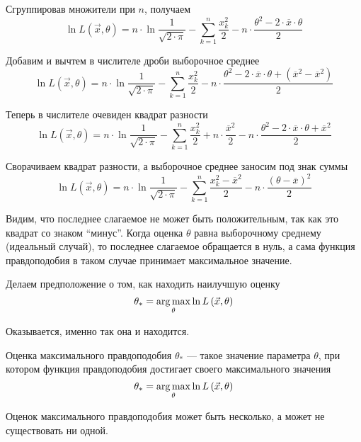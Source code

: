 \begin{example}
  Сгруппировав множители при $n$, получаем
  $$\ln{L\left( \vec{x},\theta \right)}
    =n\cdot\ln{\frac{1}{\sqrt{2\cdot\pi}}}
      -\sum_{k=1}^n \frac{x_k^2}{2}
      -n\cdot\frac{\theta^2
        -2\cdot\overline{x}\cdot\theta}{2}$$

  Добавим и вычтем в числителе дроби выборочное среднее
  $$\ln{L\left( \vec{x},\theta \right)}
    =n\cdot\ln{\frac{1}{\sqrt{2\cdot\pi}}}
      -\sum_{k=1}^n \frac{x_k^2}{2}
      -n\cdot\frac{\theta^2
        -2\cdot\overline{x}\cdot\theta
        +\left(\overline{x}^2-\overline{x}^2\right)}{2}$$

  Теперь в числителе очевиден квадрат разности
  $$\ln{L\left( \vec{x},\theta \right)}
    =n\cdot\ln{\frac{1}{\sqrt{2\cdot\pi}}}
      -\sum_{k=1}^n \frac{x_k^2}{2}
      +n\cdot\frac{\overline{x}^2}{2}
      -n\cdot\frac{\theta^2
        -2\cdot\overline{x}\cdot\theta
        +\overline{x}^2}{2}$$

  Сворачиваем квадрат разности,
  а выборочное среднее заносим под знак суммы
  $$\ln{L\left( \vec{x},\theta \right)}
    =n\cdot\ln{\frac{1}{\sqrt{2\cdot\pi}}}
      -\sum_{k=1}^n \frac{x_k^2-\overline{x}^2}{2}
      -n\cdot\frac{\left(\theta-\overline{x}\right)^2}{2}$$

  Видим, что последнее слагаемое не может быть положительным,
  так как это квадрат со знаком ``минус''.
  Когда оценка $\theta$ равна выборочному среднему (идеальный случай),
  то последнее слагаемое обращается в нуль, а сама функция правдоподобия
  в таком случае принимает максимальное значение.

  Делаем предположение о том, как находить наилучшую оценку
  $$\theta_*=\underset{\theta}{\operatorname{arg\,max}}\ln{L\left( \vec{x},\theta \right)}$$

  Оказывается, именно так она и находится.
\end{example}

\begin{definition}
  \label{def:maximumLikelihoodEstimation}
  Оценка максимального правдоподобия
  $\theta_*$ --- такое значение параметра $\theta$,
  при котором функция правдоподобия достигает своего максимального значения
  $$\theta_*=\underset{\theta}{\operatorname{arg\,max}}\ln{L\left( \vec{x},\theta \right)}$$
\end{definition}

\begin{remark}
  Оценок максимального правдоподобия может быть несколько,
  а может не существовать ни одной.
\end{remark}


